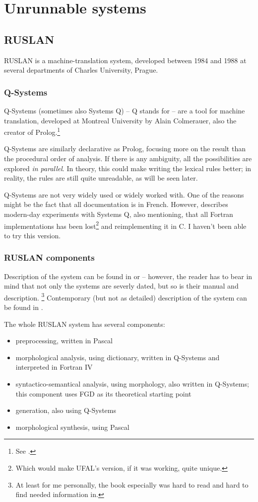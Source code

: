 \chapter{Unrunnable systems}
\section{RUSLAN}

RUSLAN is a machine-translation system, developed between 1984 and 1988 at several departments of Charles University, Prague.

\subsection{Q-Systems}
Q-Systems (sometimes also Systems Q) -- Q stands for  -- are a tool for machine translation, developed at Montreal University by Alain Colmerauer, also the creator of Prolog.\footnote{See \cite{qsystems}.} 

Q-Systems are similarly declarative as Prolog, focusing more on the result than the procedural order of analysis. If there is any ambiguity, all the possibilities are explored \emph{in parallel}. In theory, this could make writing the lexical rules better; in reality, the rules are still quite unreadable, as will be seen later.

Q-Systems are not very widely used or widely worked with. One of the reasons might be the fact that all documentation is in French. However, \cite{nguyen2009systemes} describes modern-day experiments with Systems Q, also mentioning, that all Fortran implementations has been lost\footnote{Which would make UFAL's version, if it was working, quite unique.} and reimplementing it in C. I haven't been able to try this version.


\subsection{RUSLAN components}

Description of the system can be found in \cite{olivaruslan} or \cite{hajic1987} -- however, the reader has to bear in mind that not only the systems are severly dated, but so is their manual and description. \footnote{At least for me personally, the book \cite{olivaruslan} especially was hard to read and hard to find needed information in.} Contemporary (but not as detailed) description of the system can be found in \cite{recycled}.

The whole RUSLAN system has several components:
\begin{itemize}
\item preprocessing, written in Pascal
\item morphological analysis, using dictionary, written in Q-Systems and interpreted in Fortran IV
\item syntactico-semantical analysis, using morphology, also written in Q-Systems; this component uses FGD as its theoretical starting point
\item generation, also using Q-Systems
\item morphological synthesis, using Pascal
\end{itemize}

